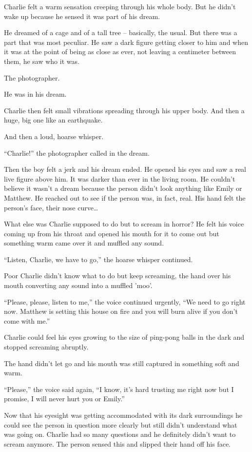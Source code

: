 Charlie felt a warm sensation creeping through his whole body. But he didn't wake up because he sensed it was part of his dream.

He dreamed of a cage and of a tall tree – basically, the usual. But there was a part that was most peculiar. He saw a dark figure getting closer to him and when it was at the point of being as close as ever, not leaving a centimeter between them, he saw who it was.

The photographer.

He was in his dream.

Charlie then felt small vibrations spreading through his upper body. And then a huge, big one like an earthquake.

And then a loud, hoarse whisper.

“Charlie!” the photographer called in the dream.

Then the boy felt a jerk and his dream ended. He opened his eyes and saw a real live figure above him. It was darker than ever in the living room. He couldn't believe it wasn't a dream because the person didn't look anything like Emily or Matthew. He reached out to see if the person was, in fact, real. His hand felt the person's face, their nose curve…

What else was Charlie supposed to do but to scream in horror? He felt his voice coming up from his throat and opened his mouth for it to come out but something warm came over it and muffled any sound.

“Listen, Charlie, we have to go,” the hoarse whisper continued.

Poor Charlie didn't know what to do but keep screaming, the hand over his mouth converting any sound into a muffled 'moo'.

“Please, please, listen to me,” the voice continued urgently, “We need to go right now. Matthew is setting this house on fire and you will burn alive if you don't come with me.”

Charlie could feel his eyes growing to the size of ping-pong balls in the dark and stopped screaming abruptly.

The hand didn't let go and his mouth was still captured in something soft and warm.

“Please,” the voice said again, “I know, it's hard trusting me right now but I promise, I will never hurt you or Emily.”

Now that his eyesight was getting accommodated with its dark surroundings he could see the person in question more clearly but still didn't understand what was going on. Charlie had so many questions and he definitely didn't want to scream anymore. The person sensed this and slipped their hand off his face.

